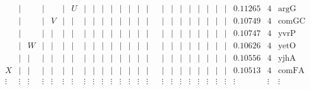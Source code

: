 \documentclass[a4paper]{article}
\begin{document}
{$$\begin{array}{ccccccccccccccccccccccccccc}
 &|& &|& &|&U&|&|&|&|&|&|&|&|& &|&|&|&|&|&|&|&|&0.11265&4&\mbox{argG}\\
 &|& &|&V&|&|&|&|&|&|&|&|&|&|& &|&|&|&|&|&|&|&|&0.10749&4&\mbox{comGC}\\
 &|& &|&|&|&|&|&|&|&|&|&|&|&|& &|&|&|&|&|&|&|&|&0.10747&4&\mbox{yvrP}\\
 &|&W&|&|&|&|&|&|&|&|&|&|&|&|& &|&|&|&|&|&|&|&|&0.10626&4&\mbox{yetO}\\
 &|&|&|&|&|&|&|&|&|&|&|&|&|&|& &|&|&|&|&|&|&|&|&0.10556&4&\mbox{yjhA}\\
X&|&|&|&|&|&|&|&|&|&|&|&|&|&|& &|&|&|&|&|&|&|&|&0.10513&4&\mbox{comFA}\\
\vdots&\vdots&\vdots&\vdots&\vdots&\vdots&\vdots&\vdots&\vdots&\vdots&\vdots&\vdots&\vdots&\vdots&\vdots& &\vdots&\vdots&\vdots&\vdots&\vdots&\vdots&\vdots&\vdots&\vdots&\vdots&\vdots
\end{array}
$$
}

\end{document}
